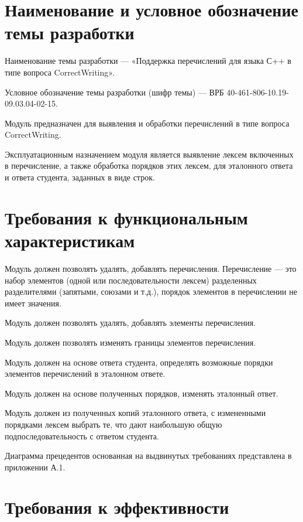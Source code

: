 \documentclass[a4paper,english]{G2-105}
\begin{document}
\section{Наименование и условное обозначение темы разработки}

\par Наименование темы разработки — «Поддержка перечислений для языка С++ в типе вопроса CorrectWriting».
\par Условное обозначение темы разработки (шифр темы) — ВРБ 40-461-806-10.19-09.03.04-02-15.

\par Модуль предназначен для выявления и обработки перечислений в типе вопроса CorrectWriting.
\par Эксплуатационным назначением модуля является выявление лексем включенных в
перечисление, а также обработка порядков этих лексем, для эталонного ответа и ответа
студента, заданных в виде строк. 

\ttl
\section{Требования к функциональным характеристикам}
\par Модуль должен позволять удалять, добавлять перечисления. Перечисление — это набор элементов (одной или последовательности лексем) разделенных
разделителями (запятыми, союзами и т.д.), порядок элементов в перечислении  не имеет значения.
\par Модуль должен позволять удалять, добавлять элементы перечисления.
\par Модуль должен позволять изменять границы элементов перечисления.
\par Модуль должен на основе ответа студента, определять возможные порядки элементов перечислений в эталонном ответе.
\par Модуль должен на основе полученных порядков, изменять эталонный ответ.
\par Модуль должен из полученных копий эталонного ответа, с измененными порядками лексем выбрать те, что дают наибольшую общую подпоследовательность с ответом студента. 
\par Диаграмма прецедентов основанная на выдвинутых требованиях представлена в приложении А.1.

\section{Требования к эффективности}
\end{document}
